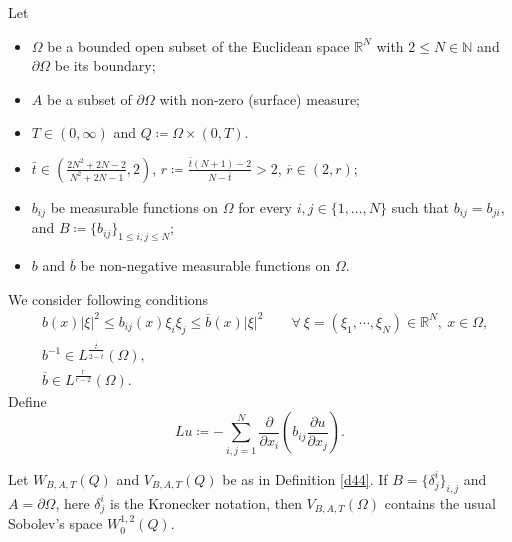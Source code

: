\documentclass[11pt, a4paper]{article}
\numberwithin{equation}{section}
\newcommand{\NN}{{\mathbb N}}
\newcommand{\RR}{{\mathbb R}}
\newcommand{\data}{\mathtt{data}}
\newcommand{\abs}[1]{\left\lvert #1\right\rvert}
\newcommand{\norm}[1]{\left\lVert #1\right\rVert}
\begin{document}
Let 
\begin{itemize}
\item $\Omega$ be a bounded open subset of the Euclidean space $\RR^{N}$
with $2 \le N \in \NN$ and $\partial\Omega$ be its boundary;
\item  $A$ be a
subset of $\partial\Omega$ with non-zero (surface) measure;
\item $T\in (0,\infty)$ and  $Q\coloneqq\Omega\times (0,T)$.
\item $\bar{t}\in \left(\frac{2N^{2}+2N-2}{N^{2}+2N-1},2 \right)$,
  $r\coloneqq \frac{\bar{t}(N+1)-2}{N-\bar{t}}>2$,
  $\overline{r}\in (2,r)$;
\item $b_{ij}$ be measurable functions on $\Omega$ for every
  $i,j \in \{1,\ldots,N\}$ such that  $b_{ij}= b_{ji}$, and
  $B\coloneqq\{b_{ij}\}_{1 \le i,j \le N}$;
\item  $b$ and
  $\overline{b}$ be non-negative measurable functions on $\Omega$.%
\end{itemize}


We consider following conditions 
\begin{subequations}
  \label{eq:ccc}
  \begin{align}
  &b(x)|\xi|^{2}\le b_{ij}(x)\xi_{i}\xi_{j}\le \overline{b}(x)\abs{\xi}^{2}\qquad\forall~\xi=(\xi_{1},\cdots,\xi_{N})\in \RR^{N},~ x\in \Omega,
\label{c1}\\
&b^{-1}\in L^{\frac{\overline{t}}{2-\overline{t}}}(\Omega),
\label{c3}\\
&\overline{b}\in L^{\frac{r}{r-2}}(\Omega).
\label{c6}
\end{align}
\end{subequations}
Define
\begin{equation}
  Lu \coloneqq - \sum_{i,j=1}^{N}\frac{\partial}{\partial x_{i}}
  \left(b_{ij} \frac{\partial u}{\partial x_{j}} \right).
\label{c5}
\end{equation}

Let $W_{B,A,T}(Q)$ and $V_{B,A,T}(Q)$ be as in Definition \ref{d44}.
If $B=\{\delta^{i}_{j}\}_{i,j}$ and $A = \partial\Omega$, here
$\delta_j^i$ is the Kronecker notation, then
$V_{B,A,T}(\Omega)$ contains the usual Sobolev's space
$W^{1,2}_{0}(Q)$.
\end{document}
